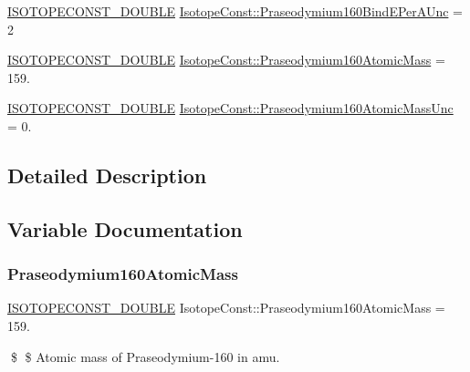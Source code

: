 \begin{DoxyCompactItemize}
\item 
\mbox{\hyperlink{group___isotope_const-_macros_ga8f45a7272ce02c0b4c65c44636ed719a}{I\+S\+O\+T\+O\+P\+E\+C\+O\+N\+S\+T\+\_\+\+D\+O\+U\+B\+LE}} \mbox{\hyperlink{group___isotope_const-_praseodymium-_pr160_ga2f3a739191dd8aee0a7310ec318e1834}{Isotope\+Const\+::\+Praseodymium160\+Bind\+E\+Per\+A\+Unc}} = 2
\item 
\mbox{\hyperlink{group___isotope_const-_macros_ga8f45a7272ce02c0b4c65c44636ed719a}{I\+S\+O\+T\+O\+P\+E\+C\+O\+N\+S\+T\+\_\+\+D\+O\+U\+B\+LE}} \mbox{\hyperlink{group___isotope_const-_praseodymium-_pr160_ga9b2305d225d72b141b1c50d265f7490e}{Isotope\+Const\+::\+Praseodymium160\+Atomic\+Mass}} = 159.
\item 
\mbox{\hyperlink{group___isotope_const-_macros_ga8f45a7272ce02c0b4c65c44636ed719a}{I\+S\+O\+T\+O\+P\+E\+C\+O\+N\+S\+T\+\_\+\+D\+O\+U\+B\+LE}} \mbox{\hyperlink{group___isotope_const-_praseodymium-_pr160_gaed98ff005ca66e8a1661a6b4c51336f3}{Isotope\+Const\+::\+Praseodymium160\+Atomic\+Mass\+Unc}} = 0.
\end{DoxyCompactItemize}


\subsection{Detailed Description}


\subsection{Variable Documentation}
\mbox{\label{group___isotope_const-_praseodymium-_pr160_ga9b2305d225d72b141b1c50d265f7490e}} 
\subsubsection{\texorpdfstring{Praseodymium160\+Atomic\+Mass}{Praseodymium160AtomicMass}}
{\footnotesize\ttfamily \mbox{\hyperlink{group___isotope_const-_macros_ga8f45a7272ce02c0b4c65c44636ed719a}{I\+S\+O\+T\+O\+P\+E\+C\+O\+N\+S\+T\+\_\+\+D\+O\+U\+B\+LE}} Isotope\+Const\+::\+Praseodymium160\+Atomic\+Mass = 159.}

\$ \$ Atomic mass of Praseodymium-\/160 in amu. \mbox{\label{group___isotope_const-_praseodymium-_pr160_gaed98ff005ca66e8a1661a6b4c51336f3}} 
